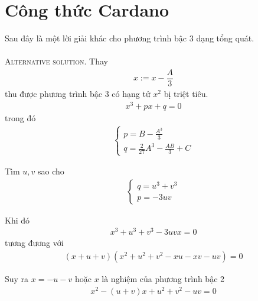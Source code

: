 \documentclass[a4paper,oneside]{book}
\numberwithin{equation}{chapter}
\begin{document}
\section{Công thức Cardano}
Sau đây là một lời giải khác cho phương trình bậc 3 dạng tổng quát.\\
\\
\textsc{Alternative solution.} Thay 
\begin{align}
x:= x - \dfrac{A}{3}
\end{align}
thu được phương trình bậc 3 có hạng tử $x^2$ bị triệt tiêu.
\begin{align}
{x^3} + px + q = 0
\end{align}
trong đó 
\begin{align}
\left\{ \begin{array}{l}
p = B - \frac{{{A^3}}}{3}\\
q = \frac{2}{{27}}{A^3} - \frac{{AB}}{3} + C
\end{array} \right.
\end{align}

Tìm $u,v$ sao cho 
\begin{align}
\left\{ \begin{array}{l}
q = {u^3} + {v^3}\\
p =  - 3uv
\end{array} \right.
\end{align}

Khi đó
\begin{align}
{x^3} + {u^3} + {v^3} - 3uvx = 0
\end{align}
tương đương với
\begin{align}
\label{3.77}
\left( {x + u + v} \right)\left( {{x^2} + {u^2} + {v^2} - xu - xv - uv} \right) = 0
\end{align}

Suy ra $x =  - u - v$ hoặc $x$ là nghiệm của phương trình bậc 2
\begin{align}
\label{3.78}
{x^2} - \left( {u + v} \right)x + {u^2} + {v^2} - uv = 0
\end{align}
\end{document}
